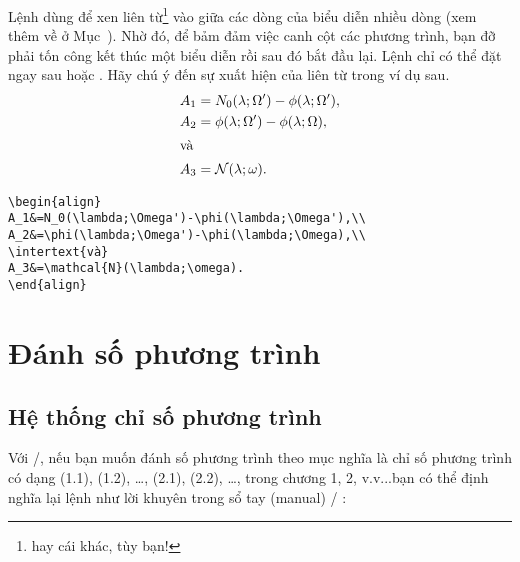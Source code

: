 \documentclass[11pt,leqno,titlepage,openany]{amsldoc}[1999/12/13]
\begin{document}
Lệnh  dùng để xen liên từ\footnote{hay cái khác, tùy bạn!}
vào giữa các dòng của biểu diễn nhiều dòng (xem thêm về 
ở Mục~). Nhờ đó, để bảm đảm việc canh cột các phương trình,
bạn đỡ phải tốn công kết thúc một biểu diễn rồi sau đó bắt đầu lại.
Lệnh  chỉ có thể đặt ngay sau \cn{\\} hoặc \cn{\\*}.
Hãy chú ý đến sự xuất hiện của liên từ  trong ví dụ sau.
\begin{align}
A_1&=N_0(\lambda;\Omega')-\phi(\lambda;\Omega'),\\
A_2&=\phi(\lambda;\Omega')-\phi(\lambda;\Omega),\\
\intertext{và}
A_3&=\mathcal{N}(\lambda;\omega).
\end{align}
\begin{verbatim}
\begin{align}
A_1&=N_0(\lambda;\Omega')-\phi(\lambda;\Omega'),\\
A_2&=\phi(\lambda;\Omega')-\phi(\lambda;\Omega),\\
\intertext{và}
A_3&=\mathcal{N}(\lambda;\omega).
\end{align}
\end{verbatim}

\section{Đánh số phương trình}

\subsection{Hệ thống chỉ số phương trình}
Với \latex/, nếu bạn muốn đánh số phương trình theo mục\mdash
nghĩa là chỉ số phương trình có dạng (1.1), (1.2), \dots, (2.1), (2.2), \dots,
trong chương 1, 2, v.v...\mdash bạn có thể định nghĩa lại lệnh
 như lời khuyên trong sổ tay (manual) \latex/ 
\cite[\S6.3, \S C.8.4]{lamport}:
\end{document}
